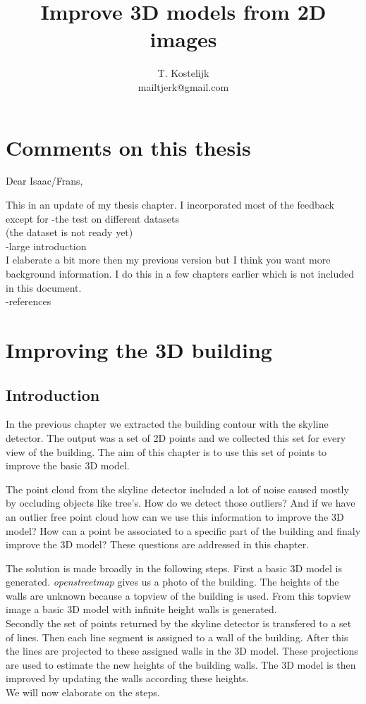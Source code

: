 \documentclass[10pt]{article}
\title{\sc Improve 3D models from 2D images}
\author{T. Kostelijk\\mailtjerk@gmail.com}
\begin{document}
\maketitle




\section{Comments on this thesis}
Dear Isaac/Frans,

This in an update of my thesis chapter. I incorporated most of the feedback except for
-the test on different datasets\\
(the dataset is not ready yet)\\
-large introduction\\
I elaberate a bit more then my previous version but I think you want more background
information. I do this in a few chapters earlier which is not included in this document.\\
-references
 
\section{Improving the 3D building}
\subsection{Introduction}
In the previous chapter we extracted the building contour with the skyline
detector. The output was a set of 2D points and we collected this set for every
view of the building.  The aim of this chapter is to use this set of points to
improve the basic 3D model. 

The point cloud from the skyline detector included a lot of noise caused mostly
by occluding objects like tree's. How do we detect those outliers?
And if we have an outlier free point cloud how can we use this information to
improve the 3D model? How can a point be associated to a specific part of the
building and finaly improve the 3D model? 
These questions are addressed in this chapter.

The solution is made broadly in the following steps. 
First a basic 3D model is generated. \emph{openstreetmap} gives us a photo of the
building.  The heights of the walls are unknown because a topview of the
building is used.  From this topview image a basic 3D model with infinite
height walls is generated.\\
Secondly the set of points returned by the skyline detector is transfered to a set of
lines. Then each line segment is assigned to a wall of the building. After this 
the lines are projected to these assigned walls in the 3D model. 
These projections are used to estimate the new heights of the building walls.
The 3D model is then improved by updating the walls according these heights. \\
We will now elaborate on the steps.
\end{document}
